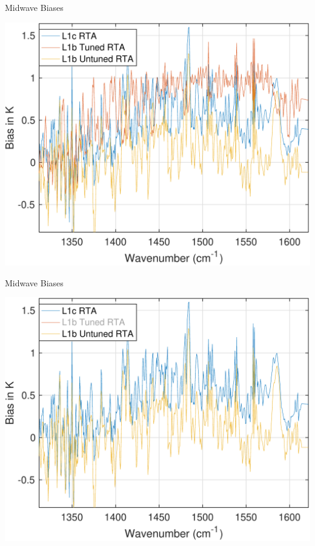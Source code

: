\documentclass[10pt,t]{beamer}
\begin{document}
\begin{frame}[label={sec:org68cebb3}]{Midwave Biases}
\begin{center}
\includegraphics[width=0.75\linewidth]{./Talk2/bias_3rta_mw.pdf}
\end{center}
\end{frame}

\begin{frame}[label={sec:org5d2824b,noframenumbering}]{Midwave Biases}
\begin{center}
\includegraphics[width=0.75\linewidth]{./Talk2/bias_3rta_mw_noL1btuning.pdf}
\end{center}
\end{frame}
\end{document}
